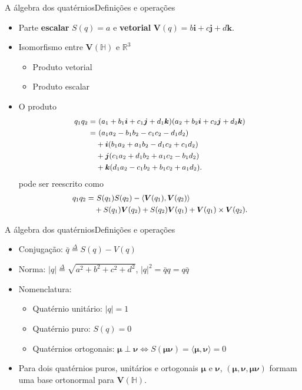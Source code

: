 \documentclass[10pt,compress]{beamer}
\newcommand{\qi}{\boldsymbol{i}}
\newcommand{\qj}{\boldsymbol{j}}
\newcommand{\qk}{\boldsymbol{k}}
\newcommand{\qmu}{\boldsymbol{\mu}}
\newcommand{\qnu}{\boldsymbol{\nu}}
\newcommand{\qV}{\boldsymbol{V}}
\begin{document}
\begin{frame}{A \'algebra dos quat\'ernios}{Defini\c c\~oes e opera\c c\~oes}
\begin{itemize}
\item Parte \textbf{escalar} $ S(q) = a $ e \textbf{vetorial} $ \qV (q) = b\qi + c\qj + d\qk $.
\item Isomorfismo entre $ \qV (\mathbb{H}) $ e $ \mathbb{R}^3 $
\begin{itemize}
\item Produto vetorial
\item Produto escalar
\end{itemize}
\item O produto 
\begin{equation}
\small
\label{eq:q_prod}
\begin{aligned}
q_1 q_2 = &  \ (a_1 + b_1\qi + c_1\qj + d_1\qk) (a_2 +  b_2\qi + c_2\qj + d_2\qk)  \\ 
= & \ (a_1 a_2 - b_1 b_2 - c_1 c_2 - d_1 d_2)  \\
& + \qi (b_1 a_2 + a_1 b_2 - d_1 c_2 + c_1 d_2)  \\
& + \qj (c_1 a_2 + d_1 b_2 + a_1 c_2 - b_1 d_2)  \\
& + \qk (d_1 a_2 - c_1 b_2 + b_1 c_2 + a_1 d_2).
\end{aligned}
\end{equation}
pode ser reescrito como
\begin{equation}
\small
\label{eq:prod_vectors}
\begin{aligned}
q_1 q_2 = & \ S(q_1)S(q_2) - \langle\qV(q_1), \qV(q_2)\rangle \\
& + S(q_1) \qV(q_2) + S(q_2)\qV(q_1) + \qV(q_1) \times \qV(q_2).
\end{aligned}
\end{equation}
\end{itemize}
\end{frame}


\begin{frame}{A \'algebra dos quat\'ernios}{Defini\c c\~oes e opera\c c\~oes}
\begin{itemize}
\item Conjuga\c c\~ao: $ \bar{q} \overset{\Delta}{=} S(q) - V(q) $
\item Norma: $ |q| \overset{\Delta}{=} \sqrt{a^2 + b^2 + c^2 + d^2} $, $ |q|^2 = \bar{q} q = q \bar{q} $
\item Nomenclatura:
\begin{itemize}
\item Quat\'ernio unit\'ario: $ |q| = 1 $
\item Quat\'ernio puro: $ S(q) = 0 $
\item Quat\'ernios ortogonais: $ \qmu \perp \qnu \iff S(\qmu \qnu) = \langle \qmu, \qnu \rangle = 0$
\end{itemize}
\item Para dois quat\'ernios puros, unit\'arios e ortogonais $ \qmu $ e $ \qnu $, $ (\qmu, \qnu, \qmu \qnu) $ formam uma base ortonormal para $ \qV (\mathbb{H}) $.
\end{itemize}
\end{frame}
\end{document}
